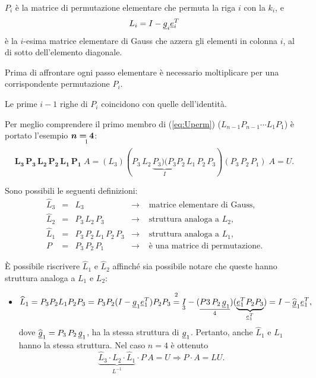 $P_i$ è la matrice di permutazione elementare che permuta la riga $i$ con la $k_i$, e 
\begin{equation}
    L_i=I-\uline g_i\uline e_i^T
\end{equation}
è la $i$-esima matrice elementare di Gauss che azzera gli elementi in colonna $i$, al di sotto dell'elemento diagonale.

Prima di affrontare ogni passo elementare è necessario moltiplicare per una corrispondente permutazione $P_i.$
\begin{remark}
    Le prime $i-1$ righe di $P_i$ coincidono con quelle dell'identità.
\end{remark}

\begin{example}
    Per meglio comprendere il primo membro di (\ref{eq:Uperm}) ($L_{n-1} P_{n-1} \cdots L_1 P_1$) è portato l'esempio $\boldsymbol n\underset{\footnotemark}{\boldsymbol {= 4}}$:
    \begin{equation*}
        \boldsymbol{L_3\,P_3\,L_2\,P_2\,L_1\,P_1}\; A=(L_3)(P_3\,L_2\,\underbrace{P_3)(P_3}_{I}P_2\,L_1\,P_2\,P_3)(P_3\, P_2\, P_1)\;A=U.
    \end{equation*}
    
    Sono possibili le seguenti definizioni:
    \begin{equation*}
        \begin{matrix}
            \widehat L_3 &=& L_3 &\rightarrow& \text{ matrice elementare di Gauss},\\
            \widehat L_2 &=& P_3\, L_2\, P_3 &\rightarrow& \text{ struttura analoga a }L_2,\\
            \widehat L_1 &=& P_3\,P_2\,L_1\,P_2\,P_3 &\rightarrow& \text{ struttura analoga a }L_1,\\
            P &=& P_3\,P_2\, P_1 &\rightarrow& \text{ è una matrice di permutazione}.
        \end{matrix}
    \end{equation*}
    
    È possibile riscrivere $\widehat L_1$ e $\widehat L_2$ affinché sia possibile notare che queste hanno struttura analoga a $L_1$ e $L_2$:
    
    \begin{itemize}
        \item \begin{equation*}
            \widehat L_1=P_3P_2L_1P_2P_3=P_3P_2(I-\uline g_1\uline e_1^T)P_2P_3\overset{\footnotemark}{=}\underset{\footnotemark}{I}-(\underset{\footnotemark}{\uline{P3\,P_2\,\uline g_1}})(\underbrace{\uline e_1^TP_2P_3}_{\uline e_1^T})=I-\widehat{\uline g}_1\uline e_1^T,
        \end{equation*}
        dove $\widehat{\uline g}_1=P_3\, P_2\, \uline g_1$, ha la stessa struttura di $\uline g_1$. Pertanto, anche $\widehat L_1$ e $L_1$ hanno la stessa struttura. Nel caso $n=4$ è ottenuto
        \begin{equation*}
                \underbrace{\widehat L_3\cdot \widehat L_2\cdot \widehat L_1}_{L^{-1}}\cdot P\, A = U\Rightarrow P\cdot A = LU.
        \end{equation*}


\end{itemize}
\end{example}
